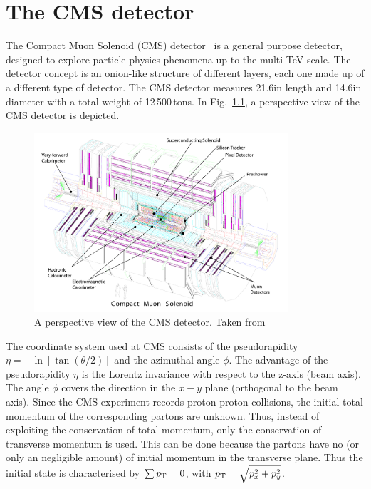 \chapter{The CMS detector}
The Compact Muon Solenoid (CMS) detector~\cite{bib:CMS:experiment,bib:CMS:TDR} is a general purpose detector, designed to explore particle physics phenomena up to the multi-TeV scale.
The detector concept is an onion-like structure of different layers, each one made up of a different type of detector. 
The CMS detector measures 21.6\m in length and 14.6\m in diameter with a total weight of 12\,500\,tons.
In Fig.~\ref{fig:CMSdetector}, a perspective view of the CMS detector is depicted. 
\begin{figure}[!b]
  \centering
      \includegraphics[width=0.84\textwidth]{figures/experiment/CMS/cms_complete_labelled_reduced_size.pdf}
  \caption{A perspective view of the CMS detector. Taken from~\cite{bib:CMS:experiment}}  
  \label{fig:CMSdetector}
\end{figure}

The coordinate system used at CMS consists of the pseudorapidity $\eta = -\ln \left[ \tan{\left(\theta/2\right)} \right]$ and the azimuthal angle $\phi$.
The advantage of the pseudorapidity $\eta$ is the Lorentz invariance with respect to the z-axis (beam axis).
The angle $\phi$ covers the direction in the $x-y$ plane (orthogonal to the beam axis).
Since the CMS experiment records proton-proton collisions, the initial total momentum of the corresponding partons are unknown.
Thus, instead of exploiting the conservation of total momentum, only the conservation of transverse momentum is used.
This can be done because the partons have no (or only an negligible amount) of initial momentum in the transverse plane.
Thus the initial state is characterised by $\sum{\ensuremath{p_{\text{T}}}}=0$, with $p_{\text{T}} = \sqrt{p_x^2 + p_y^2}$.

